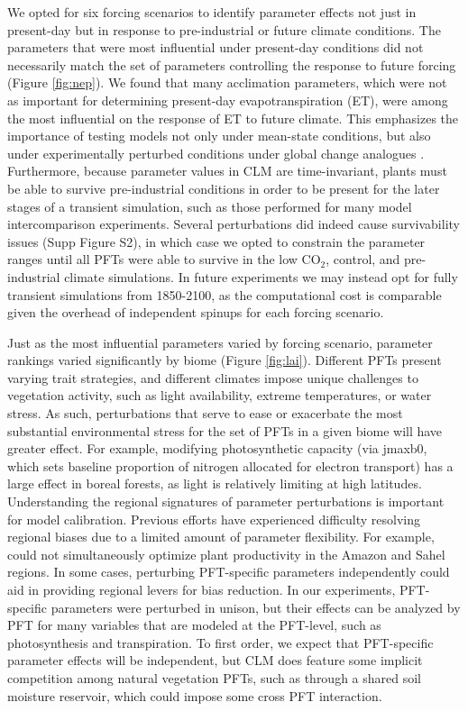 \documentclass[draft]{agujournal2019}
\begin{document}
We opted for six forcing scenarios to identify parameter effects not just in present-day but in response to pre-industrial or future climate conditions. The parameters that were most influential under present-day conditions did not necessarily match the set of parameters controlling the response to future forcing (Figure \ref{fig:nep}). We found that many acclimation parameters, which were not as important for determining present-day evapotranspiration (ET), were among the most influential on the response of ET to future climate. This emphasizes the importance of testing models not only under mean-state conditions, but also under experimentally perturbed conditions under global change analogues \cite{wieder2019}. Furthermore, because parameter values in CLM are time-invariant, plants must be able to survive pre-industrial conditions in order to be present for the later stages of a transient simulation, such as those performed for many model intercomparison experiments. Several perturbations did indeed cause survivability issues (Supp Figure S2), in which case we opted to constrain the parameter ranges until all PFTs were able to survive in the low CO$_2$, control, and pre-industrial climate simulations. In future experiments we may instead opt for fully transient simulations from 1850-2100, as the computational cost is comparable given the overhead of independent spinups for each forcing scenario.

Just as the most influential parameters varied by forcing scenario, parameter rankings varied significantly by biome (Figure \ref{fig:lai}). Different PFTs present varying trait strategies, and different climates impose unique challenges to vegetation activity, such as light availability, extreme temperatures, or water stress. As such, perturbations that serve to ease or exacerbate the most substantial environmental stress for the set of PFTs in a given biome will have greater effect. For example, modifying photosynthetic capacity (via jmaxb0, which sets baseline proportion of nitrogen allocated for electron transport) has a large effect in boreal forests, as light is relatively limiting at high latitudes.  Understanding the regional signatures of parameter perturbations is important for model calibration. Previous efforts have experienced difficulty resolving regional biases due to a limited amount of parameter flexibility. For example, \cite{dagon2020} could not simultaneously optimize plant productivity in the Amazon and Sahel regions. In some cases, perturbing PFT-specific parameters independently could aid in providing regional levers for bias reduction. In our experiments, PFT-specific parameters were perturbed in unison, but their effects can be analyzed by PFT for many variables that are modeled at the PFT-level, such as photosynthesis and transpiration. To first order, we expect that PFT-specific parameter effects will be independent, but CLM does feature some implicit competition among natural vegetation PFTs, such as through a shared soil moisture reservoir, which could impose some cross PFT interaction. 
\end{document}
